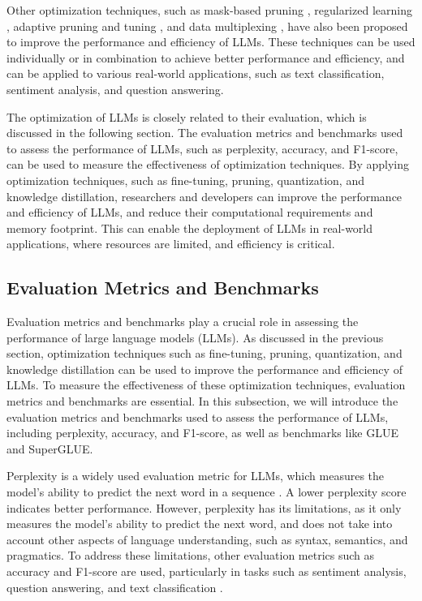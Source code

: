 \documentclass[11pt]{article}
\begin{document}
Other optimization techniques, such as mask-based pruning \cite{ref85}, regularized learning \cite{ref86}, adaptive pruning and tuning \cite{ref87}, and data multiplexing \cite{ref88}, have also been proposed to improve the performance and efficiency of LLMs. These techniques can be used individually or in combination to achieve better performance and efficiency, and can be applied to various real-world applications, such as text classification, sentiment analysis, and question answering.

The optimization of LLMs is closely related to their evaluation, which is discussed in the following section. The evaluation metrics and benchmarks used to assess the performance of LLMs, such as perplexity, accuracy, and F1-score, can be used to measure the effectiveness of optimization techniques. By applying optimization techniques, such as fine-tuning, pruning, quantization, and knowledge distillation, researchers and developers can improve the performance and efficiency of LLMs, and reduce their computational requirements and memory footprint. This can enable the deployment of LLMs in real-world applications, where resources are limited, and efficiency is critical.

\subsection{Evaluation Metrics and Benchmarks}

Evaluation metrics and benchmarks play a crucial role in assessing the performance of large language models (LLMs). As discussed in the previous section, optimization techniques such as fine-tuning, pruning, quantization, and knowledge distillation can be used to improve the performance and efficiency of LLMs. To measure the effectiveness of these optimization techniques, evaluation metrics and benchmarks are essential. In this subsection, we will introduce the evaluation metrics and benchmarks used to assess the performance of LLMs, including perplexity, accuracy, and F1-score, as well as benchmarks like GLUE and SuperGLUE.

Perplexity is a widely used evaluation metric for LLMs, which measures the model's ability to predict the next word in a sequence \cite{ref89}. A lower perplexity score indicates better performance. However, perplexity has its limitations, as it only measures the model's ability to predict the next word, and does not take into account other aspects of language understanding, such as syntax, semantics, and pragmatics. To address these limitations, other evaluation metrics such as accuracy and F1-score are used, particularly in tasks such as sentiment analysis, question answering, and text classification \cite{ref90}.
\end{document}
